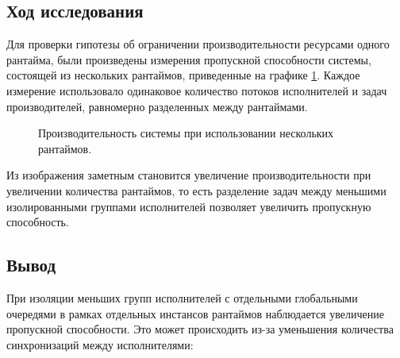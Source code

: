 \subsection{Ход исследования}

Для проверки гипотезы об ограничении производительности ресурсами одного рантайма, были произведены измерения пропускной способности системы, состоящей из нескольких рантаймов, приведенные на графике \ref{fig:tatlin:multi_rt:eval}. Каждое измерение использовало одинаковое количество потоков исполнителей и задач производителей, равномерно разделенных между рантаймами.

\begin{figure}[H]
    \begin{center}
    \end{center}

    \caption{Производительность системы при использовании нескольких рантаймов.}
    \label{fig:tatlin:multi_rt:eval}
\end{figure}

Из изображения заметным становится увеличение производительности при увеличении количества рантаймов, то есть разделение задач между меньшими изолированными группами исполнителей позволяет увеличить пропускную способность.

\subsection{Вывод}

При изоляции меньших групп исполнителей с отдельными глобальными очередями в рамках отдельных инстансов рантаймов наблюдается увеличение пропускной способности. Это может происходить из-за уменьшения количества синхронизаций между исполнителями:

